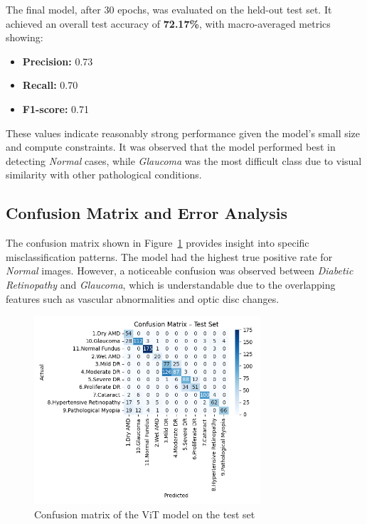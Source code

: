 \documentclass[a4paper,12pt]{report}
\begin{document}
The final model, after 30 epochs, was evaluated on the held-out test set. It achieved an overall test accuracy of \textbf{72.17\%}, with macro-averaged metrics showing:

\begin{itemize}
    \item \textbf{Precision:} 0.73
    \item \textbf{Recall:} 0.70
    \item \textbf{F1-score:} 0.71
\end{itemize}

These values indicate reasonably strong performance given the model's small size and compute constraints. It was observed that the model performed best in detecting \textit{Normal} cases, while \textit{Glaucoma} was the most difficult class due to visual similarity with other pathological conditions.

\subsection{Confusion Matrix and Error Analysis}

The confusion matrix shown in Figure~\ref{fig:confusion_matrix} provides insight into specific misclassification patterns. The model had the highest true positive rate for \textit{Normal} images. However, a noticeable confusion was observed between \textit{Diabetic Retinopathy} and \textit{Glaucoma}, which is understandable due to the overlapping features such as vascular abnormalities and optic disc changes.

\begin{figure}[h]
    \centering
    \includegraphics[width=0.75\textwidth]{confusion_matrix.png}
    \caption{Confusion matrix of the ViT model on the test set}
    \label{fig:confusion_matrix}
\end{figure}
\end{document}
